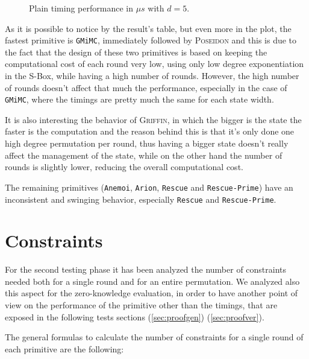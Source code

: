 \documentclass[12pt, a4paper]{report}
\begin{document}
\begin{figure}[H]
  \hspace{60pt}
  \caption{Plain timing performance in $\mu s$ with $d = 5$.}\label{plot:plain}
\end{figure}

As it is possible to notice by the result's table, but even more in the plot, the fastest primitive is \texttt{GMiMC}, immediately followed by \textsc{Poseidon} and this is due to the fact that the design of these two primitives is based on keeping the computational cost of each round very low, using only low degree exponentiation in the S-Box, while having a high number of rounds.
However, the high number of rounds doesn't affect that much the performance, especially in the case of \texttt{GMiMC}, where the timings are pretty much the same for each state width.

It is also interesting the behavior of \textsc{Griffin}, in which the bigger is the state the faster is the computation and the reason behind this is that it's only done one high degree permutation per round, thus having a bigger state doesn't really affect the management of the state, while on the other hand the number of rounds is slightly lower, reducing the overall computational cost.

The remaining primitives (\texttt{Anemoi}, \texttt{Arion}, \texttt{Rescue} and \texttt{Rescue-Prime}) have an inconsistent and swinging behavior, especially \texttt{Rescue} and \texttt{Rescue-Prime}.

\section{Constraints}\label{sec:constraints}

For the second testing phase it has been analyzed the number of constraints needed both for a single round and for an entire permutation.
We analyzed also this aspect for the zero-knowledge evaluation, in order to have another point of view on the performance of the primitive other than the timings, that are exposed in the following tests sections (\ref{sec:proofgen}) (\ref{sec:proofver}).

The general formulas to calculate the number of constraints for a single round of each primitive are the following:
\end{document}
